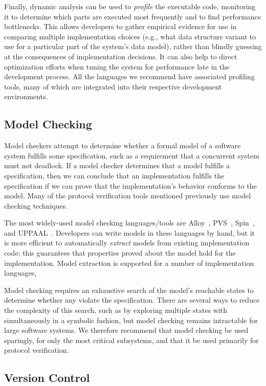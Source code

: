 Finally, dynamic analysis can be used to \emph{profile} the executable
code, monitoring it to determine which parts are executed most
frequently and to find performance bottlenecks. This allows developers
to gather empirical evidence for use in comparing multiple
implementation choices (e.g., what data structure variant to use for a
particular part of the system's data model), rather than blindly
guessing at the consequences of implementation decisions. It can also
help to direct optimization efforts when tuning the system for
performance late in the development process. All the languages we
recommend have associated profiling tools, many of which are
integrated into their respective development environments.

\subsection{Model Checking}

Model checkers attempt to determine whether a formal model of a
software system fulfills some specification, such as a requirement
that a concurrent system must not deadlock. If a model checker
determines that a model fulfills a specification, then we can conclude
that an implementation fulfills the specification if we can prove that
the implementation's behavior conforms to the model. Many of the
protocol verification tools mentioned previously use model checking
techniques.

The most widely-used model checking languages/tools are
Alloy~\cite{Alloy}, PVS~\cite{PVS}, Spin~\cite{Spin}, and
UPPAAL~\cite{UPPAAL}. Developers can write models in these languages
by hand, but it is more efficient to automatically \emph{extract}
models from existing implementation code; this guarantees that
properties proved about the model hold for the implementation. Model
extraction is supported for a number of implementation languages,

Model checking requires an exhaustive search of the model's reachable
states to determine whether any violate the specification. There are
several ways to reduce the complexity of this search, such as by
exploring multiple states with simultaneously in a symbolic fashion,
but model checking remains intractable for large software systems. We
therefore recommend that model checking be used sparingly, for only
the most critical subsystems, and that it be used primarily for
protocol verification.

\subsection{Version Control}

